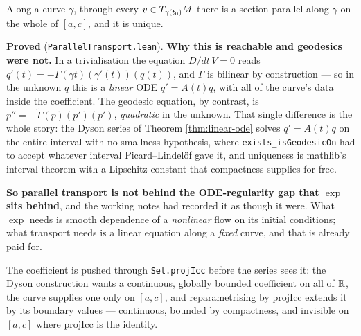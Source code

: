 \begin{lemma}
  \label{lem:parallel-transport}
  \leanok
  Along a curve $\gamma$, through every $v \in T_{\gamma(t_0)}M$ there is a section parallel
  along $\gamma$ on the whole of $[a,c]$, and it is unique.

  \textbf{Proved} (\texttt{ParallelTransport.lean}). \textbf{Why this is reachable and
  geodesics were not.} In a trivialisation the equation $D/dt\,V = 0$ reads
  $q'(t) = -\Gamma(\gamma t)(\gamma'(t))(q(t))$, and $\Gamma$ is bilinear by construction --- so
  in the unknown $q$ this is a \emph{linear} ODE $q' = A(t)q$, with all of the curve's data
  inside the coefficient. The geodesic equation, by contrast, is
  $p'' = -\tilde\Gamma(p)(p')(p')$, \emph{quadratic} in the unknown. That single difference is
  the whole story: the Dyson series of Theorem \ref{thm:linear-ode} solves $q' = A(t)q$ on the
  entire interval with no smallness hypothesis, where \texttt{exists\_isGeodesicOn} had to
  accept whatever interval Picard--Lindel\"of gave it, and uniqueness is mathlib's interval
  theorem with a Lipschitz constant that compactness supplies for free.

  \textbf{So parallel transport is not behind the ODE-regularity gap that $\exp$ sits behind},
  and the working notes had recorded it as though it were. What $\exp$ needs is smooth
  dependence of a \emph{nonlinear} flow on its initial conditions; what transport needs is a
  linear equation along a \emph{fixed} curve, and that is already paid for.

  The coefficient is pushed through \texttt{Set.projIcc} before the series sees it: the Dyson
  construction wants a continuous, globally bounded coefficient on all of $\mathbb{R}$, the curve
  supplies one only on $[a,c]$, and reparametrising by $\mathrm{projIcc}$ extends it by its
  boundary values --- continuous, bounded by compactness, and invisible on $[a,c]$ where
  $\mathrm{projIcc}$ is the identity.


\end{lemma}
